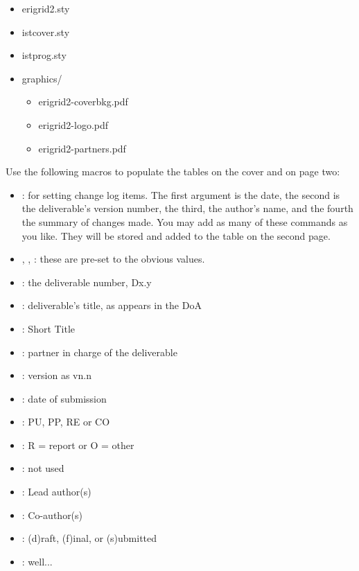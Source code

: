 \begin{itemize}
    \item erigrid2.sty
    \item istcover.sty
    \item istprog.sty
    \item graphics/
    \begin{itemize}
        \item erigrid2-coverbkg.pdf
        \item erigrid2-logo.pdf
        \item erigrid2-partners.pdf
    \end{itemize}
\end{itemize}

Use the following macros to populate the tables on the cover and on page two:

\begin{itemize}
    \item {}: for setting change log items. The first argument is the date, the second is the deliverable's version number, the third, the author's name, and the   fourth the summary of changes made. You may add as many of these   commands as you like. They will be stored and added to the table on   the second page.
    \item {}, , : these are pre-set to the obvious values.
    \item {}: the deliverable number, Dx.y
    \item {}: deliverable's title, as appears in the DoA
    \item {}: Short Title
    \item {}: partner in charge of the deliverable
    \item {}: version as vn.n
    \item {}: date of submission
    \item {}: PU, PP, RE or CO
    \item {}: R = report or O = other
    \item {}: not used
    \item {}: Lead author(s)
    \item {}: Co-author(s)
    \item {}: (d)raft, (f)inal, or (s)ubmitted
    \item {}: well...
\end{itemize}


